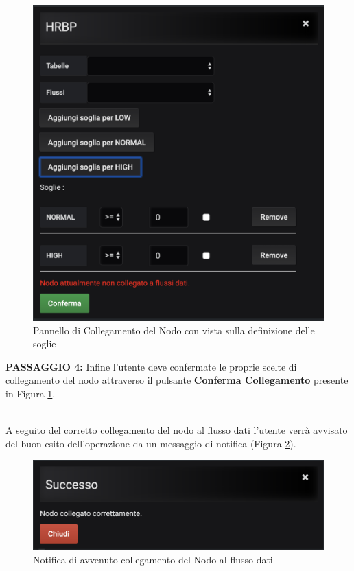 \begin{figure}[H]
	\begin{center}
		\includegraphics[scale=0.55]{./images/PannelloSoglie.png}
		 \caption{Pannello di Collegamento del Nodo con vista sulla definizione delle soglie}	
		 \label{PannelloSoglie}
	\end{center}
\end{figure}

\textbf{PASSAGGIO 4:} Infine l'utente deve confermate le proprie scelte di collegamento del nodo attraverso il pulsante \textbf{Conferma Collegamento} presente in Figura \ref{PannelloSoglie}.

~\\
A seguito del corretto collegamento del nodo al flusso dati l'utente verrà avvisato del buon esito dell'operazione da un messaggio di notifica (Figura \ref{NotificaCollegamento}).

\begin{figure}[H]
	\begin{center}
		\includegraphics[scale=0.6]{./images/NotificaCollegamento.png}
		 \caption{Notifica di avvenuto collegamento del Nodo al flusso dati}	
		 \label{NotificaCollegamento}
	\end{center}
\end{figure}

